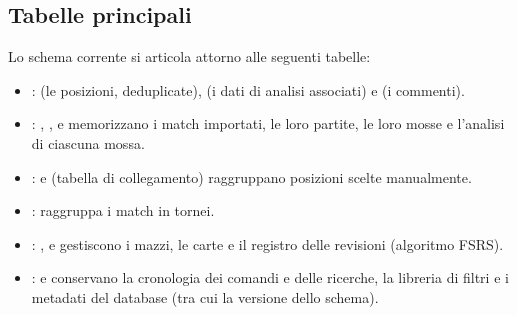 \documentclass[letterpaper,10pt,italian]{sphinxmanual}
\begin{document}
\subsection{Tabelle principali}
\label{\detokenize{annexe_db_scheme:principales-tables}}
\sphinxAtStartPar
Lo schema corrente si articola attorno alle seguenti tabelle:
\begin{itemize}
\item {} 
\sphinxAtStartPar
{}:  (le posizioni, deduplicate),  (i dati di analisi associati) e  (i commenti).

\item {} 
\sphinxAtStartPar
{}: , ,  e  memorizzano i match importati, le loro partite, le loro mosse e l’analisi di ciascuna mossa.

\item {} 
\sphinxAtStartPar
{}:  e  (tabella di collegamento) raggruppano posizioni scelte manualmente.

\item {} 
\sphinxAtStartPar
{}:  raggruppa i match in tornei.

\item {} 
\sphinxAtStartPar
{}: ,  e  gestiscono i mazzi, le carte e il registro delle revisioni (algoritmo FSRS).

\item {} 
\sphinxAtStartPar
{}:  e  conservano la cronologia dei comandi e delle ricerche,  la libreria di filtri e  i metadati del database (tra cui la versione dello schema).

\end{itemize}
\end{document}

